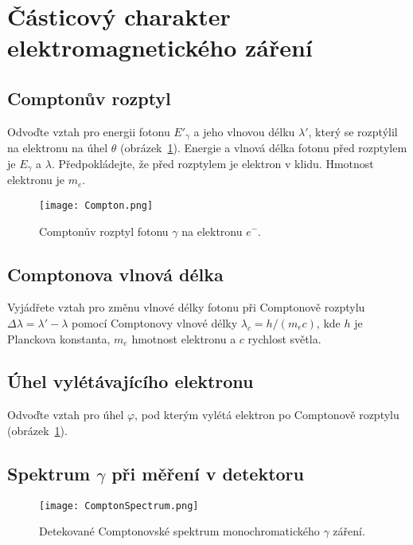 \section{Částicový charakter elektromagnetického záření}
    \subsection{Comptonův rozptyl}
        Odvoďte vztah pro energii fotonu $E'_{\gamma}$ a jeho vlnovou délku $\lambda'$, který se rozptýlil na elektronu na úhel $\theta$ (obrázek~\ref{fig:Compton}).
        Energie a vlnová délka fotonu před rozptylem je $E_{\gamma}$ a $\lambda$.
        Předpokládejte, že před rozptylem je elektron v klidu.
        Hmotnost elektronu je $m_{e}$.

        \begin{figure}[!h]
            \centering
            \texttt{[image: Compton.png]}
            \caption{Comptonův rozptyl fotonu $\gamma$ na elektronu $e^{-}$.}
            \label{fig:Compton}
        \end{figure}

    \subsection{Comptonova vlnová délka}
        Vyjádřete vztah pro změnu vlnové délky fotonu při Comptonově rozptylu $\Delta\lambda=\lambda'-\lambda$ pomocí Comptonovy vlnové délky $\lambda_{c}=h/(m_{e}c)$, kde $h$ je Planckova konstanta, $m_{e}$ hmotnost elektronu a $c$ rychlost světla.

    \subsection{Úhel vylétávajícího elektronu}
        Odvoďte vztah pro úhel $\varphi$, pod kterým vylétá elektron po Comptonově rozptylu (obrázek~\ref{fig:Compton}).

    \subsection{Spektrum $\gamma$ při měření v detektoru}
        \begin{figure}[!h]
            \centering
            \texttt{[image: ComptonSpectrum.png]}
            \caption{Detekované Comptonovské spektrum monochromatického $\gamma$ záření.}
            \label{fig:ComptonSpectrum}
        \end{figure}        
    
